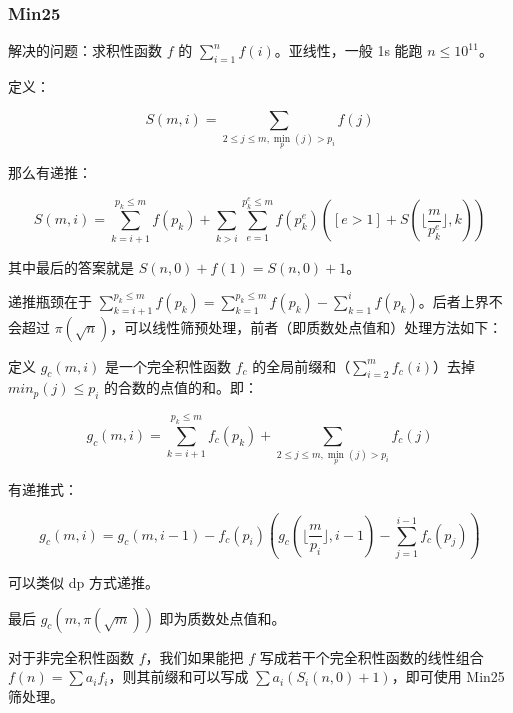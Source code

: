 \subsubsection{Min25}
解决的问题：求积性函数 $f$ 的 $\sum_{i=1}^n f(i)$。亚线性，一般 1s 能跑 $n\le 10^{11}$。

定义：

$$S(m,i)=\sum_{2\le j\le m, \min_p(j)>p_i}f(j)$$

那么有递推：

$$S(m,i) = \sum_{k=i+1}^{p_k\le m}f(p_k) + \sum_{k>i}\sum_{e=1}^{p_k^e\le m}f(p_k^e)\left([e>1] + S(\lfloor\frac{m}{p_k^e}\rfloor, k) \right)$$

其中最后的答案就是 $S(n,0)+f(1)=S(n,0)+1$。

递推瓶颈在于 $\sum_{k=i+1}^{p_k\le m}f(p_k)=\sum_{k=1}^{p_k\le m}f(p_k)-\sum_{k=1}^{i}f(p_k)$。后者上界不会超过 $\pi(\sqrt{n})$，可以线性筛预处理，前者（即质数处点值和）处理方法如下：

定义 $g_c(m,i)$ 是一个完全积性函数 $f_c$ 的全局前缀和（$\sum_{i=2}^m f_c(i)$）去掉 $min_p(j)\le p_i$ 的合数的点值的和。即：

$$g_c(m,i)=\sum_{k=i+1}^{p_k\le m}f_c(p_k)+\sum_{2\le j\le m,\min_p(j)>p_i}f_c(j)$$

有递推式：

$$g_c(m,i)=g_c(m,i-1)-f_c(p_i)\left(g_c(\lfloor\frac{m}{p_i}\rfloor,i-1)-\sum_{j=1}^{i-1}f_c(p_j)\right)$$

可以类似 dp 方式递推。

最后 $g_c(m, \pi(\sqrt{m}))$ 即为质数处点值和。

对于非完全积性函数 $f$，我们如果能把 $f$ 写成若干个完全积性函数的线性组合 $f(n)=\sum a_i f_i$，则其前缀和可以写成 $\sum a_i (S_i(n,0)+1)$，即可使用 Min25 筛处理。


